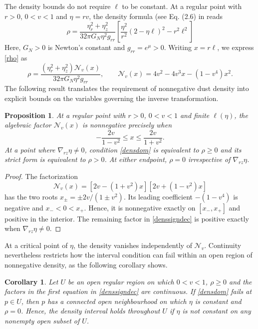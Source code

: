 \documentclass[amsmath,amsfonts,amssymb,aps,pra,superscriptaddress,10pt]{revtex4-2}
\numberwithin{equation}{section}
\theoremstyle{plain}
\newtheorem{proposition}{Proposition}
\newtheorem{corollary}{Corollary}
\theoremstyle{definition}
\theoremstyle{remark}
\theoremstyle{definition}
\begin{document}
The density bounds do not require $\ell$ to be constant. At a regular point with $r>0$, $0<v<1$ and $\eta=rv$, the density formula (see Eq. (2.6) in \cite{Astesiano2022EPJC} reads
\begin{equation}\label{rho}
\rho=\frac{\eta_r^2+\eta_z^2}{32\pi G_N \eta^2 g_{rr}}
\left[\frac{\eta^2}{r^2}(2-\eta\ell)^2-r^2\ell^2\right]
\end{equation}
Here, $G_N>0$ is Newton's constant and $g_{rr}=e^\mu>0$. Writing $x=r\ell$, we express \eqref{rho} as
\begin{equation}\label{denssigndec}
\rho=\frac{(\eta_r^2+\eta_z^2)\mathcal{N}_v(x)}{32\pi G_N\eta^2 g_{rr}},\qquad
\mathcal{N}_v(x)=4v^2-4v^3x-(1-v^4)x^2.
\end{equation}
The following result translates the requirement of nonnegative dust density into explicit bounds on the variables governing the inverse transformation.

\begin{proposition}\label{densposdom}
At a regular point with $r>0$, $0<v<1$ and finite $\ell(\eta)$, the algebraic factor $\mathcal{N}_v(x)$ is nonnegative precisely when
\begin{equation}\label{densdom}
-\frac{2v}{1-v^2}\leq x\leq\frac{2v}{1+v^2}.
\end{equation}
At a point where $\nabla_{rz}\eta\neq 0$, condition \eqref{densdom} is equivalent to $\rho\geq 0$ and its strict form is equivalent to $\rho>0$. At either endpoint, $\rho=0$ irrespective of $\nabla_{rz}\eta$.
\end{proposition}

\begin{proof}
The factorization
\begin{equation}\label{densfactor}
\mathcal{N}_v(x)=[2v-(1+v^2)x][2v+(1-v^2)x]
\end{equation}
has the two roots $x_\pm=\pm 2v/(1\pm v^2)$. Its leading coefficient $-(1-v^4)$ is negative and $x_-<0<x_+$. Hence, it is nonnegative exactly on $[x_-,x_+]$ and positive in the interior. The remaining factor in \eqref{denssigndec} is positive exactly when $\nabla_{rz}\eta\neq 0$.
\end{proof}

At a critical point of $\eta$, the density vanishes independently of $\mathcal{N}_v$. Continuity nevertheless restricts how the interval condition can fail within an open region of nonnegative density, as the following corollary shows.

\begin{corollary}
Let $U$ be an open regular region on which $0<v<1$, $\rho\geq 0$ and the factors in the first equation in \eqref{denssigndec} are continuous. If \eqref{densdom} fails at $p\in U$, then $p$ has a connected open neighbourhood on which $\eta$ is constant and $\rho=0$. Hence, the density interval holds throughout $U$ if $\eta$ is not constant on any nonempty open subset of $U$.
\end{corollary}
\end{document}
